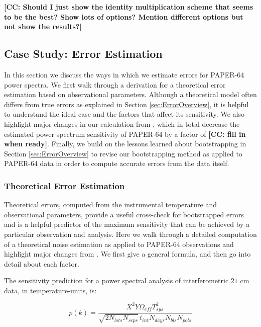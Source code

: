 \documentclass[preprint2,numberedappendix,tighten]{aastex6}  %
\newcommand{\cc}[1]{{\color{purple} \textbf{[CC: #1]}}}
\begin{document}
\cc{Should I just show the identity multiplication scheme that seems to be the best? Show lots of options? Mention different options but not show the results?}

\subsection{Case Study: Error Estimation}
\label{sec:Error}

In this section we discuss the ways in which we estimate errors for PAPER-64 power spectra. We first walk through a derivation for a theoretical error estimation based on observational parameters. Although a theoretical model often differs from true errors as explained in Section \ref{sec:ErrorOverview}, it is helpful to understand the ideal case and the factors that affect its sensitivity. We also highlight major changes in our calculation from \citet{ali_et_al2015}, which in total decrease the estimated power spectrum sensitivity of PAPER-64 by a factor of \cc{fill in when ready}. Finally, we build on the lessons learned about bootstrapping in Section \ref{sec:ErrorOverview} to revise our bootstrapping method as applied to PAPER-64 data in order to compute accurate errors from the data itself.

\subsubsection{Theoretical Error Estimation}
\label{sec:PSSense}

Theoretical errors, computed from the instrumental temperature and observational parameters, provide a useful cross-check for bootstrapped errors and is a helpful predictor of the maximum sensitivity that can be achieved by a particular observation and analysis. Here we walk through a detailed computation of a theoretical noise estimation as applied to PAPER-64 observations and highlight major changes from \citet{ali_et_al2015}. We first give a general formula, and then go into detail about each factor.

The sensitivity prediction for a power spectral analysis of interferometric $21$ cm data, in temperature-units, is:

\begin{equation}
\label{eq:sense}
p(k) = \frac{X^{2}Y \Omega_{eff} T_{sys}^{2}}{\sqrt{2N_{lsts}N_{seps}}\,t_{int}N_{days}N_{bls}N_{pols}}
\end{equation}
\end{document}
